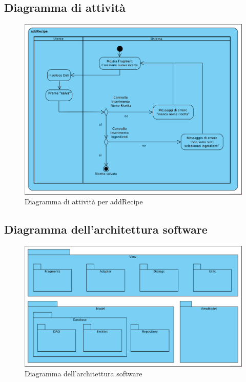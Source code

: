 \documentclass[12pt]{article}
\begin{document}
\subsection{Diagramma di attività}
\begin{figure}[H]
\centering
\includegraphics[width=440px]{diagramma_attivita_addRecipe.png}
\caption{\label{fig:diagramma_di_attivita}Diagramma di attività per addRecipe}
\end{figure}


\subsection{Diagramma dell'architettura software}
\begin{figure}[H]
\centering
\includegraphics[width=440px]{diagramma_architettura.png}
\caption{\label{fig:diagramma_architettura_software}Diagramma dell'architettura software}
\end{figure}


\newpage
\end{document}
